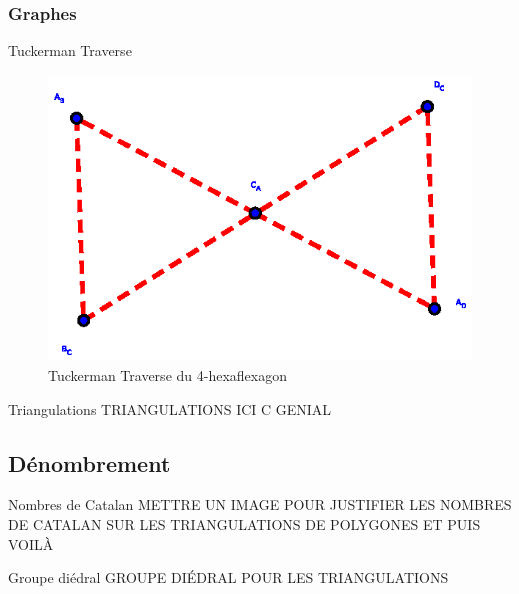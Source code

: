 \documentclass[french,xcolor=dvipsnames]{beamer}
\begin{document}
		\subsubsection{Graphes}
		\begin{frame}{Tuckerman Traverse}
			\begin{figure}
				\includegraphics[scale=0.6]{TT_graphe_4.eps}
				\caption{Tuckerman Traverse du 4-hexaflexagon}
			\end{figure}
		\end{frame}		
		
		\begin{frame}{Triangulations}
			TRIANGULATIONS ICI C GENIAL		
		\end{frame}
		
		\subsection{Dénombrement}
		\begin{frame}{Nombres de Catalan}
			METTRE UN IMAGE POUR JUSTIFIER LES NOMBRES DE CATALAN SUR LES TRIANGULATIONS DE POLYGONES ET PUIS VOILÀ
		\end{frame}
		\begin{frame}{Groupe diédral}
			GROUPE DIÉDRAL POUR LES TRIANGULATIONS
		\end{frame}
		
\end{document}
